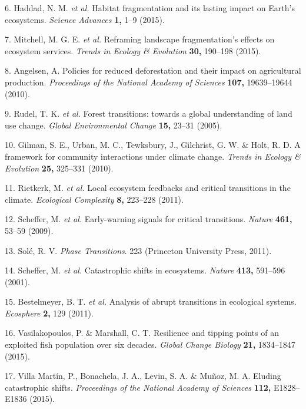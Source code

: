 \documentclass[]{article}
\begin{document}
\hypertarget{ref-Haddad2015}{}
6. Haddad, N. M. \emph{et al.} Habitat fragmentation and its lasting
impact on Earth's ecosystems. \emph{Science Advances} \textbf{1,} 1--9
(2015).

\hypertarget{ref-Mitchell2015}{}
7. Mitchell, M. G. E. \emph{et al.} Reframing landscape fragmentation's
effects on ecosystem services. \emph{Trends in Ecology \& Evolution}
\textbf{30,} 190--198 (2015).

\hypertarget{ref-Angelsen2010}{}
8. Angelsen, A. Policies for reduced deforestation and their impact on
agricultural production. \emph{Proceedings of the National Academy of
Sciences} \textbf{107,} 19639--19644 (2010).

\hypertarget{ref-Rudel2005}{}
9. Rudel, T. K. \emph{et al.} Forest transitions: towards a global
understanding of land use change. \emph{Global Environmental Change}
\textbf{15,} 23--31 (2005).

\hypertarget{ref-Gilman2010}{}
10. Gilman, S. E., Urban, M. C., Tewksbury, J., Gilchrist, G. W. \&
Holt, R. D. A framework for community interactions under climate change.
\emph{Trends in Ecology \& Evolution} \textbf{25,} 325--331 (2010).

\hypertarget{ref-Rietkerk2011}{}
11. Rietkerk, M. \emph{et al.} Local ecosystem feedbacks and critical
transitions in the climate. \emph{Ecological Complexity} \textbf{8,}
223--228 (2011).

\hypertarget{ref-Scheffer2009}{}
12. Scheffer, M. \emph{et al.} Early-warning signals for critical
transitions. \emph{Nature} \textbf{461,} 53--59 (2009).

\hypertarget{ref-Sole2011}{}
13. Solé, R. V. \emph{Phase Transitions}. 223 (Princeton University
Press, 2011).

\hypertarget{ref-Scheffer2001}{}
14. Scheffer, M. \emph{et al.} Catastrophic shifts in ecosystems.
\emph{Nature} \textbf{413,} 591--596 (2001).

\hypertarget{ref-Bestelmeyer2011}{}
15. Bestelmeyer, B. T. \emph{et al.} Analysis of abrupt transitions in
ecological systems. \emph{Ecosphere} \textbf{2,} 129 (2011).

\hypertarget{ref-Vasilakopoulos2015}{}
16. Vasilakopoulos, P. \& Marshall, C. T. Resilience and tipping points
of an exploited fish population over six decades. \emph{Global Change
Biology} \textbf{21,} 1834--1847 (2015).

\hypertarget{ref-VillaMartin2015}{}
17. Villa Martín, P., Bonachela, J. A., Levin, S. A. \& Muñoz, M. A.
Eluding catastrophic shifts. \emph{Proceedings of the National Academy
of Sciences} \textbf{112,} E1828--E1836 (2015).
\end{document}

